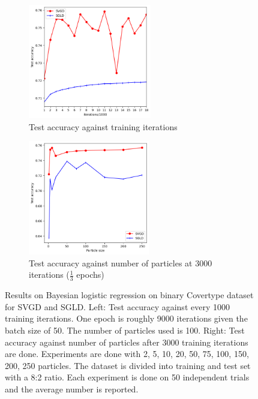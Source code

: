 \begin{figure}[ht]
	\centering
	\begin{subfigure}[b]{0.45\textwidth}
		\centering
		\includegraphics[height=5cm]{figs/sgvd_sgld_1.png}
		\caption{Test accuracy against training iterations}
		\label{fig:acc_iter}
	\end{subfigure}
	\hfill
	\begin{subfigure}[b]{0.45\textwidth}
		\centering
		\includegraphics[height=5cm]{figs/sgvd_sgld_2.png}
		\caption{Test accuracy against number of particles at 3000 iterations ($\frac{1}{3}$ epochs)}
		\label{fig:acc_par}
	\end{subfigure}
	\caption{Results on Bayesian logistic regression on binary Covertype dataset for SVGD and SGLD. Left: Test accuracy against every 1000 training iterations. One epoch is roughly 9000 iterations given the batch size of 50. The number of particles used is 100. Right: Test accuracy against number of particles after 3000 training iterations are done. Experiments are done with 2, 5, 10, 20, 50, 75, 100, 150, 200, 250 particles. The dataset is divided into training and test set with a 8:2 ratio. Each experiment is done on 50 independent trials and the average number is reported.}
	\label{fig:covertype}
\end{figure}